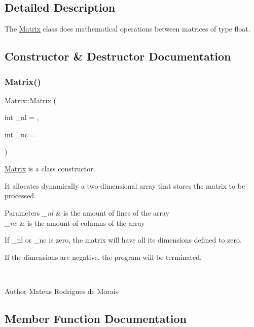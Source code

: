 \subsection{Detailed Description}
The \hyperlink{class_matrix}{Matrix} class does mathematical operations between matrices of type float. 

\subsection{Constructor \& Destructor Documentation}
\mbox{\label{class_matrix_ad46ac5e001ada4438e5f74c5eccdac2f}} 
\subsubsection{\texorpdfstring{Matrix()}{Matrix()}}
{\footnotesize\ttfamily Matrix\+::\+Matrix (\begin{DoxyParamCaption}\item[{int}]{\+\_\+nl = {},  }\item[{int}]{\+\_\+nc = {} }\end{DoxyParamCaption})}



\hyperlink{class_matrix}{Matrix} is a class constructor. 

It allocates dynamically a two-\/dimensional array that stores the matrix to be processed. 
\begin{DoxyParams}{Parameters}
{\em \+\_\+nl} & is the amount of lines of the array \\
\hline
{\em \+\_\+nc} & is the amount of columns of the array 
\begin{DoxyItemize}
\item If \+\_\+nl or \+\_\+nc is zero, the matrix will have all its dimensions defined to zero.  
\item If the dimensions are negative, the program will be terminated.  
\end{DoxyItemize}\\
\hline
\end{DoxyParams}
\begin{DoxyAuthor}{Author}
Mateus Rodrigues de Morais 
\end{DoxyAuthor}


\subsection{Member Function Documentation}
\mbox{\label{class_matrix_ac84e74316e8692a18dd704c745970efe}} 
